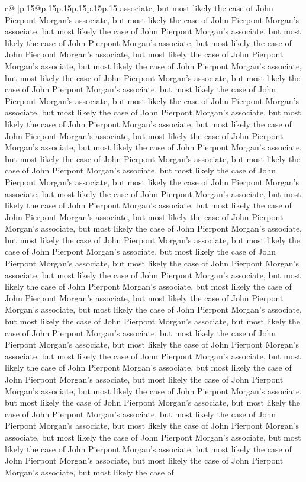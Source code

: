 \documentclass{article}
\begin{document}
{\begin{supertabular}{c@{$\;$}|p{.15\linewidth}@{}p{.15\linewidth}p{.15\linewidth}p{.15\linewidth}p{.15\linewidth}p{.15\linewidth}}
{{{associate, but most likely the case of John Pierpont Morgan's associate, but most likely the case of John Pierpont Morgan's associate, but most likely the case of John Pierpont Morgan's associate, but most likely the case of John Pierpont Morgan's associate, but most likely the case of John Pierpont Morgan's associate, but most likely the case of John Pierpont Morgan's associate, but most likely the case of John Pierpont Morgan's associate, but most likely the case of John Pierpont Morgan's associate, but most likely the case of John Pierpont Morgan's associate, but most likely the case of John Pierpont Morgan's associate, but most likely the case of John Pierpont Morgan's associate, but most likely the case of John Pierpont Morgan's associate, but most likely the case of John Pierpont Morgan's associate, but most likely the case of John Pierpont Morgan's associate, but most likely the case of John Pierpont Morgan's associate, but most likely the case of John Pierpont Morgan's associate, but most likely the case of John Pierpont Morgan's associate, but most likely the case of John Pierpont Morgan's associate, but most likely the case of John Pierpont Morgan's associate, but most likely the case of John Pierpont Morgan's associate, but most likely the case of John Pierpont Morgan's associate, but most likely the case of John Pierpont Morgan's associate, but most likely the case of John Pierpont Morgan's associate, but most likely the case of John Pierpont Morgan's associate, but most likely the case of John Pierpont Morgan's associate, but most likely the case of John Pierpont Morgan's associate, but most likely the case of John Pierpont Morgan's associate, but most likely the case of John Pierpont Morgan's associate, but most likely the case of John Pierpont Morgan's associate, but most likely the case of John Pierpont Morgan's associate, but most likely the case of John Pierpont Morgan's associate, but most likely the case of John Pierpont Morgan's associate, but most likely the case of John Pierpont Morgan's associate, but most likely the case of John Pierpont Morgan's associate, but most likely the case of John Pierpont Morgan's associate, but most likely the case of John Pierpont Morgan's associate, but most likely the case of John Pierpont Morgan's associate, but most likely the case of John Pierpont Morgan's associate, but most likely the case of John Pierpont Morgan's associate, but most likely the case of John Pierpont Morgan's associate, but most likely the case of John Pierpont Morgan's associate, but most likely the case of John Pierpont Morgan's associate, but most likely the case of John Pierpont Morgan's associate, but most likely the case of John Pierpont Morgan's associate, but most likely the case of John Pierpont Morgan's associate, but most likely the case of John Pierpont Morgan's associate, but most likely the case of John Pierpont Morgan's associate, but most likely the case of John Pierpont Morgan's associate, but most likely the case of John Pierpont Morgan's associate, but most likely the case of John Pierpont Morgan's associate, but most likely the case of John Pierpont Morgan's associate, but most likely the case of }}}
\end{supertabular}}
\end{document}
